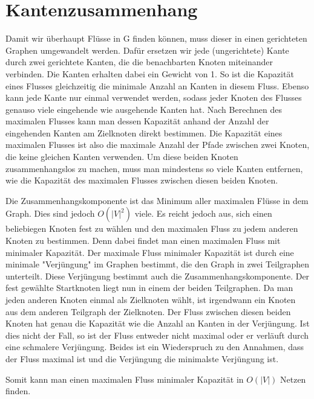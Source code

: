 \documentclass[a4paper,10pt]{article}
\begin{document}
\section{Kantenzusammenhang}
Damit wir überhaupt Flüsse in G finden können, muss dieser in einen gerichteten Graphen umgewandelt werden. Dafür ersetzen wir jede (ungerichtete) Kante durch zwei gerichtete Kanten, die die benachbarten Knoten miteinander verbinden. Die Kanten erhalten dabei ein Gewicht von 1. So ist die Kapazität eines Flusses gleichzeitig die minimale Anzahl an Kanten in diesem Fluss. Ebenso kann jede Kante nur einmal verwendet werden, sodass jeder Knoten des Flusses genauso viele eingehende wie ausgehende Kanten hat. Nach Berechnen des maximalen Flusses kann man dessen Kapazität anhand der Anzahl der eingehenden Kanten am Zielknoten direkt bestimmen. Die Kapazität eines maximalen Flusses ist also die maximale Anzahl der Pfade zwischen zwei Knoten, die keine gleichen Kanten verwenden.
Um diese beiden Knoten zusammenhangslos zu machen, muss man mindestens so viele Kanten entfernen, wie die Kapazität des maximalen Flusses zwischen diesen beiden Knoten.

Die Zusammenhangskomponente ist das Minimum aller maximalen Flüsse in dem Graph. Dies sind jedoch $O(|V|^2)$ viele.
Es reicht jedoch aus, sich einen beliebiegen Knoten fest zu wählen und den maximalen Fluss zu jedem anderen Knoten zu bestimmen. Denn dabei findet man einen maximalen Fluss mit minimaler Kapazität. Der maximale Fluss minimaler Kapazität ist durch eine minimale "Verjüngung" im Graphen bestimmt, die den Graph in zwei Teilgraphen unterteilt. Diese Verjüngung bestimmt auch die Zusammenhangskomponente. Der fest gewählte Startknoten liegt nun in einem der beiden Teilgraphen. Da man jeden anderen Knoten einmal als Zielknoten wählt, ist irgendwann ein Knoten aus dem anderen Teilgraph der Zielknoten. Der Fluss zwischen diesen beiden Knoten hat genau die Kapazität wie die Anzahl an Kanten in der Verjüngung. Ist dies nicht der Fall, so ist der Fluss entweder nicht maximal oder er verläuft durch eine schmalere Verjüngung. Beides ist ein Wiederspruch zu den Annahmen, dass der Fluss maximal ist und die Verjüngung die minimalste Verjüngung ist.

Somit kann man einen maximalen Fluss minimaler Kapazität in $O(|V|)$ Netzen finden.
\end{document}

